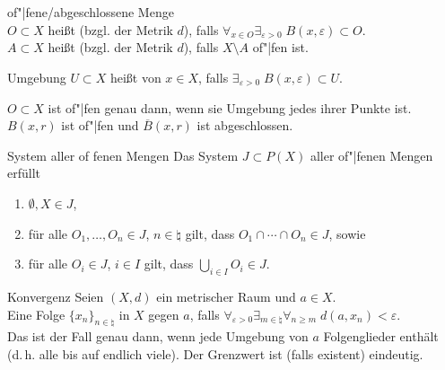 \begin{Def}{of"|fene/abgeschlossene Menge}\\
    $O \subset X$ heißt  (bzgl. der Metrik $d$), falls
    $\forall_{x \in O} \exists_{\varepsilon > 0}\;
    B(x, \varepsilon) \subset O$. \\
    $A \subset X$ heißt  (bzgl. der Metrik $d$),
    falls $X \setminus A$ of"|fen ist.
\end{Def}

\begin{Def}{Umgebung}
    $U \subset X$ heißt  von $x \in X$, falls
    $\exists_{\varepsilon > 0}\; B(x, \varepsilon) \subset U$.
\end{Def}

\begin{Bsp}
    $O \subset X$ ist of"|fen genau dann, wenn sie Umgebung jedes ihrer Punkte
    ist. \\
    $B(x, r)$ ist of"|fen und $\overline{B}(x, r)$ ist abgeschlossen.
\end{Bsp}

\begin{Satz}{System aller of \!\!fenen Mengen}
    Das System $J \subset P(X)$ aller of"|fenen Mengen erfüllt
    \begin{enumerate}[label=(O\arabic*)]
        \item
        $\emptyset, X \in J$,
        
        \item
        für alle $O_1, \dotsc, O_n \in J$, $n \in \natural$ gilt, dass
        $O_1 \cap \dotsb \cap O_n \in J$, sowie
        
        \item
        für alle $O_i \in J$, $i \in I$ gilt, dass
        $\bigcup_{i \in I} O_i \in J$.
    \end{enumerate}
\end{Satz}

\linie

\begin{Def}{Konvergenz}
    Seien $(X, d)$ ein metrischer Raum und $a \in X$. \\
    Eine Folge $\{x_n\}_{n \in \natural}$ in $X$
     gegen $a$, falls
    $\forall_{\varepsilon > 0} \exists_{m \in \natural} \forall_{n \ge m}\;
    d(a, x_n) < \varepsilon$. \\
    Das ist der Fall genau dann, wenn jede Umgebung von $a$ 
    Folgenglieder enthält \\
    (d.\,h. alle bis auf endlich viele).
    Der Grenzwert ist (falls existent) eindeutig.
\end{Def}

